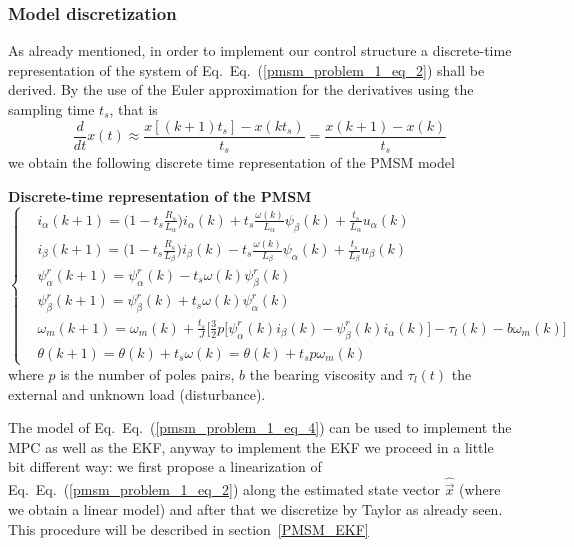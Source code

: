 \documentclass[11pt,a4paper]{scrartcl}
\numberwithin{equation}{section}
\theoremstyle{it}
\theoremstyle{definition}
\renewcommand{\eqref}[1]{Eq.~(\ref{#1})}
\begin{document}
\begin{onehalfspace}
\subsubsection{Model discretization}
As already mentioned, in order to implement our control structure a discrete-time representation 
of the system of Eq.~\eqref{pmsm_problem_1_eq_2} shall be derived. By the use of 
the Euler approximation for the derivatives using the sampling time $t_s$, that is 
\begin{equation}\label{pmsm_problem_1_eq_3}
	\frac{d}{dt}x(t)\approx\frac{x[(k+1)t_s]-x(kt_s)}{t_s}=\frac{x(k+1)-x(k)}{t_s}
\end{equation}
we obtain the following discrete time representation of the PMSM model
\begin{mybox}
	\textbf{Discrete-time representation of the PMSM}
	\begin{equation}\label{pmsm_problem_1_eq_4}
		\left\lbrace \begin{aligned}
			& i_\alpha(k+1)=\Big(1-t_s\frac{R_s}{L_\alpha}\Big) i_\alpha(k) 
			+t_s\frac{\omega(k)}{L_\alpha}\psi_\beta(k)+\frac{t_s}{L_\alpha}u_\alpha(k)
			\\[6pt]
			& i_\beta(k+1) = \Big(1-t_s\frac{R_s}{L_\beta}\Big)i_\beta(k) 
			-t_s\frac{\omega(k)}{L_\beta}\psi_\alpha(k)+\frac{t_s}{L_\beta}u_\beta(k)
			\\[6pt]
			&\psi_\alpha^r(k+1) = \psi_\alpha^r(k) -t_s\omega(k)\psi_\beta^r(k) 
			\\[6pt]
			&\psi_\beta^r(k+1) = \psi_\beta^r(k) + t_s\omega(k)\psi_\alpha^r(k) 
			\\[6pt]
			&\omega_m(k+1) = \omega_m(k) + \frac{t_s}{J}\Bigg[\frac{3}{2}p 
			\Big[\psi^r_{\alpha}(k)i_{\beta}(k)-\psi^r_{\beta}(k)i_{\alpha}(k)\Big] 
			-\tau_l(k) -b{\omega}_m(k) \Bigg]\\[6pt]
			& {\theta}(k+1) = {\theta}(k) + t_s\omega(k) ={\theta}(k) + t_s 
			p\omega_m(k)
		\end{aligned} \right. 
	\end{equation}
	where $p$ is the number of poles pairs, $b$ the bearing viscosity and 
	$\tau_l(t)$ the external and unknown load (disturbance).
\end{mybox}
The model of Eq.~\eqref{pmsm_problem_1_eq_4} can be used to implement the MPC as well as the EKF, anyway to implement the EKF we proceed in a little bit different way: we first propose a linearization of Eq.~\eqref{pmsm_problem_1_eq_2} along the estimated state vector $\hat{\vec{x}}$ (where we obtain a linear model) and after that we discretize by Taylor as already seen. This procedure will be described in section~\ref{PMSM_EKF}




\end{onehalfspace}
\end{document}
